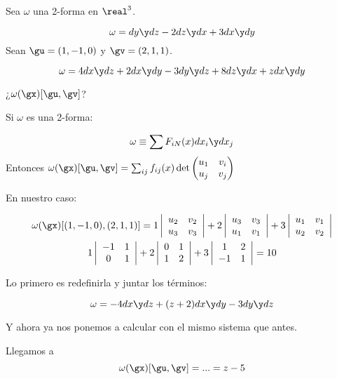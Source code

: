\begin{problem}[1]
Sea $\omega$ una 2-forma en $\real^3$.

\ppart
\[\omega = dy\y dz - 2 dz\y dx + 3 dx\y dy\]
Sean $\gu = (1,-1,0)$ y $\gv = (2,1,1)$.

\ppart
\[\omega = 4dx\y dz + 2dx\y dy - 3 dy\y dz + 8 dz\y dx + zdx\y dy\]

¿$\omega(\gx)[\gu,\gv]$?


\solution
\spart
Si $\omega$ es una 2-forma:

\[\omega \equiv \sum F_{iN}(x)dx_i\y dx_j\]
Entonces $\omega(\gx)[\gu,\gv] = \sum_{ij} f_{ij}(x)\det \begin{pmatrix}
u_1&v_i\\u_j&v_j
\end{pmatrix}$

En nuestro caso:

\begin{gather*}
\omega(\gx)[(1,-1,0),(2,1,1)] = 1 \left|\begin{array}{cc}
u_2&v_2\\u_3&v_3
\end{array}\right| +
2 \left|\begin{array}{cc}
u_3&v_3\\u_1&v_1
\end{array}\right|+
3 \left|\begin{array}{cc}
u_1&v_1\\u_2&v_2
\end{array}\right|\\
1 \left|\begin{array}{cc}
-1&1\\0&1
\end{array}\right|
+
2 \left|\begin{array}{cc}
0&1\\1&2
\end{array}\right|
+
3 \left|\begin{array}{cc}
1&2\\-1&1
\end{array}\right| = 10
\end{gather*}

 \spart Lo primero es redefinirla y juntar los términos:
 
 \[\omega = -4dx\y dz + (z+2)dx\y dy - 3 dy\y dz\]
 
 Y ahora ya nos ponemos a calcular con el mismo sistema que antes.
 
 Llegamos a \[\omega(\gx)[\gu,\gv] = ... = z-5\]
\end{problem}

